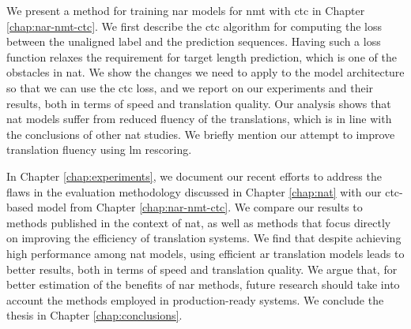 We present a method for training \acl{nar} models for \ac{nmt} with \ac{ctc} in
Chapter \ref{chap:nar-nmt-ctc}. We first describe the \ac{ctc} algorithm for
computing the loss between the unaligned label and the prediction
sequences. Having such a loss function relaxes the requirement for target
length prediction, which is one of the obstacles in \ac{nat}. We show the
changes we need to apply to the model architecture so that we can use the
\ac{ctc} loss, and we report on our experiments and their results, both in
terms of speed and translation quality.  Our analysis shows that \ac{nat}
models suffer from reduced fluency of the translations, which is in line with
the conclusions of other \ac{nat} studies.  We briefly mention our attempt to
improve translation fluency using \acl{lm} rescoring.

In Chapter \ref{chap:experiments}, we document our recent efforts to address
the flaws in the evaluation methodology discussed in Chapter \ref{chap:nat}
with our \acs{ctc}-based model from Chapter \ref{chap:nar-nmt-ctc}. We compare
our results to methods published in the context of \ac{nat}, as well as methods
that focus directly on improving the efficiency of translation systems.  We
find that despite achieving high performance among \ac{nat} models, using
efficient \acl{ar} translation models leads to better results, both in terms of
speed and translation quality. We argue that, for better estimation of the
benefits of \acl{nar} methods, future research should take into account the
methods employed in production-ready systems.
%
We conclude the thesis in Chapter \ref{chap:conclusions}.

